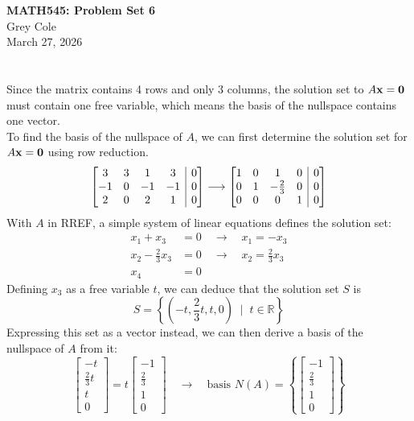 \documentclass[]{article}
\makeatletter
\newenvironment{augmx}[1]{%
	\left[\begin{array}{@{}*{#1}{c}|c@{}}
	}{%
	\end{array}\right]
}
\newcommand{\reals}{\mathbb{R}}
\newcommand{\bmat}[1]{\begin{bmatrix}#1\end{bmatrix}}
\makeatother
\begin{document}
	\begin{center}
		{\Large\textbf{MATH545: Problem Set 6}}\\
		\large Grey Cole\\
		March 27, 2026
	\end{center}
\section{}
Since the matrix contains 4 rows and only 3 columns, the solution set to $A\vb{x}=\vb{0}$ must contain one free variable, which means the basis of the nullspace contains one vector.\\
To find the basis of the nullspace of $A$, we can first determine the solution set for $A\vb{x}=\vb{0}$ using row reduction.
\[ \begin{augmx}{4}3&3&1&3&0\\-1&0&-1&-1&0\\2&0&2&1&0\end{augmx} \longrightarrow \begin{augmx}{4}1&0&1&0&0\\0&1&-\frac{2}{3}&0&0\\0&0&0&1&0\end{augmx}\]
With $A$ in RREF, a simple system of linear equations defines the solution set:
\begin{align*}
		x_1 + x_3 &= 0 \quad \rightarrow \quad x_1 = -x_3\\
		x_2 - \frac{2}{3}x_3 &= 0 \quad \rightarrow \quad x_2 = \frac{2}{3}x_3\\
		x_4 &= 0
\end{align*}
Defining $x_3$ as a free variable $t$, we can deduce that the solution set $S$ is
\[ S = \left\{ (-t, \frac{2}{3}t, t, 0) \;\;|\;\; t \in \reals \right\} \]
Expressing this set as a vector instead, we can then derive a basis of the nullspace of $A$ from it:
\[ \bmat{-t\\\frac{2}{3}t\\t\\0} = t\bmat{-1\\\frac{2}{3}\\1\\0} \quad \longrightarrow \quad \boxed{\text{basis } N(A) = \left\{\bmat{-1\\\frac{2}{3}\\1\\0}\right\}} \]

\section{}
\end{document}

